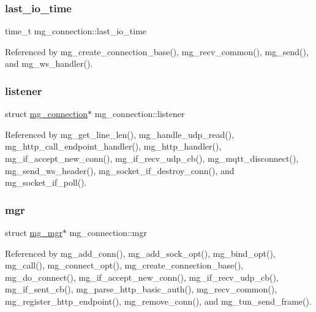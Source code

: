 \subsubsection{\texorpdfstring{last\+\_\+io\+\_\+time}{last\_io\_time}}
{\footnotesize\ttfamily time\+\_\+t mg\+\_\+connection\+::last\+\_\+io\+\_\+time}



Referenced by mg\+\_\+create\+\_\+connection\+\_\+base(), mg\+\_\+recv\+\_\+common(), mg\+\_\+send(), and mg\+\_\+ws\+\_\+handler().

\mbox{\label{structmg__connection_a9392bec67d0dc8df58e6c171214ddf8d_a9392bec67d0dc8df58e6c171214ddf8d}} 
\subsubsection{\texorpdfstring{listener}{listener}}
{\footnotesize\ttfamily struct \hyperlink{structmg__connection}{mg\+\_\+connection}$\ast$ mg\+\_\+connection\+::listener}



Referenced by mg\+\_\+get\+\_\+line\+\_\+len(), mg\+\_\+handle\+\_\+udp\+\_\+read(), mg\+\_\+http\+\_\+call\+\_\+endpoint\+\_\+handler(), mg\+\_\+http\+\_\+handler(), mg\+\_\+if\+\_\+accept\+\_\+new\+\_\+conn(), mg\+\_\+if\+\_\+recv\+\_\+udp\+\_\+cb(), mg\+\_\+mqtt\+\_\+disconnect(), mg\+\_\+send\+\_\+ws\+\_\+header(), mg\+\_\+socket\+\_\+if\+\_\+destroy\+\_\+conn(), and mg\+\_\+socket\+\_\+if\+\_\+poll().

\mbox{\label{structmg__connection_ac341f1f2bd18e030fe90a914e4517506_ac341f1f2bd18e030fe90a914e4517506}} 
\subsubsection{\texorpdfstring{mgr}{mgr}}
{\footnotesize\ttfamily struct \hyperlink{structmg__mgr}{mg\+\_\+mgr}$\ast$ mg\+\_\+connection\+::mgr}



Referenced by mg\+\_\+add\+\_\+conn(), mg\+\_\+add\+\_\+sock\+\_\+opt(), mg\+\_\+bind\+\_\+opt(), mg\+\_\+call(), mg\+\_\+connect\+\_\+opt(), mg\+\_\+create\+\_\+connection\+\_\+base(), mg\+\_\+do\+\_\+connect(), mg\+\_\+if\+\_\+accept\+\_\+new\+\_\+conn(), mg\+\_\+if\+\_\+recv\+\_\+udp\+\_\+cb(), mg\+\_\+if\+\_\+sent\+\_\+cb(), mg\+\_\+parse\+\_\+http\+\_\+basic\+\_\+auth(), mg\+\_\+recv\+\_\+common(), mg\+\_\+register\+\_\+http\+\_\+endpoint(), mg\+\_\+remove\+\_\+conn(), and mg\+\_\+tun\+\_\+send\+\_\+frame().

